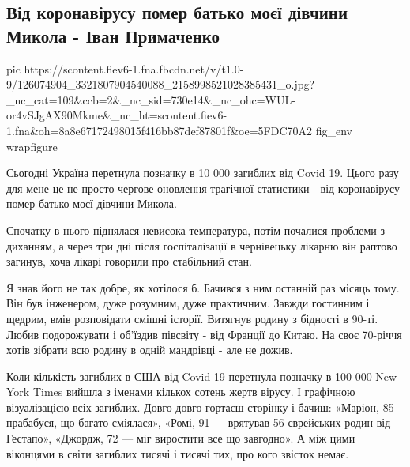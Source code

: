  
 
 

\subsection{Від коронавірусу помер батько моєї дівчини Микола - Іван Примаченко}
\label{sec:18_11_2020.fb.ivan_prymachenko.1.kovid_victims_ua}


\ifcmt
pic https://scontent.fiev6-1.fna.fbcdn.net/v/t1.0-9/126074904_3321807904540088_2158998521028385431_o.jpg?_nc_cat=109&ccb=2&_nc_sid=730e14&_nc_ohc=WUL-or4vSJgAX90Mkme&_nc_ht=scontent.fiev6-1.fna&oh=8a8e67172498015f416bb87def87801f&oe=5FDC70A2
fig_env wrapfigure
\fi

Сьогодні Україна перетнула позначку в 10 000 загиблих від Covid 19. Цього разу
для мене це не просто чергове оновлення трагічної статистики - від коронавірусу
помер батько моєї дівчини Микола. 

Спочатку в нього піднялася невисока температура, потім почалися проблеми з
диханням, а через три дні після госпіталізації в чернівецьку лікарню він
раптово загинув, хоча лікарі говорили про стабільний стан. 

Я знав його не так добре, як хотілося б. Бачився з ним останній раз місяць
тому. Він був інженером, дуже розумним, дуже практичним. Завжди гостинним і
щедрим, вмів розповідати смішні історії. Витягнув родину з бідності в 90-ті.
Любив подорожувати і об'їздив півсвіту - від Франції до Китаю. На своє 70-річчя
хотів зібрати всю родину в одній мандрівці - але не дожив. 

Коли кількість загиблих в США від Covid-19 перетнула позначку в 100 000 New
York Times вийшла з іменами кількох сотень жертв вірусу. І графічною
візуалізацією всіх загиблих. Довго-довго гортаєш сторінку і бачиш: «Маріон, 85
– прабабуся, що багато сміялася», «Ромі, 91 --- врятував 56 єврейських родин від
Гестапо», «Джордж, 72 --- міг виростити все що завгодно». А між цими віконцями в
світи загиблих тисячі і тисячі тих, про кого звісток немає. 

